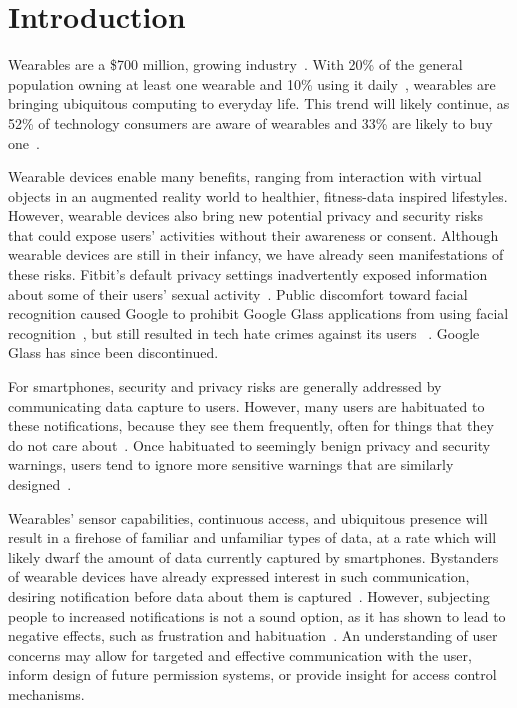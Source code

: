 
\section{Introduction}

Wearables are a \$700 million, growing industry~\cite{cmo}. With 20\% of the general population owning at least one wearable and 10\% using it daily~\cite{WearableStatNews}, wearables are bringing ubiquitous computing to everyday life. This trend will likely continue, as 52\% of technology consumers are aware of wearables and 33\% are likely to buy one~\cite{NPD}.  

Wearable devices enable many benefits, ranging from interaction with virtual objects in an augmented reality world to healthier, fitness-data inspired lifestyles. However, wearable devices also bring new potential privacy and security risks that could expose users' activities without their awareness or consent. Although wearable devices are still in their infancy, we have already seen manifestations of these risks. Fitbit's default privacy settings inadvertently exposed information about some of their users' sexual activity~\cite{Fitbit}. Public discomfort toward facial recognition caused Google to prohibit Google Glass applications from using facial recognition~\cite{GlassDetection}, but still resulted in tech hate crimes against its users ~\cite{1_russell_2014, 16_gross_2014}. Google Glass has since been discontinued.

For smartphones, security and privacy risks are generally addressed by communicating data capture to users. However, many users are habituated to these notifications, because they see them frequently, often for things that they do not care about~\cite{felt2012android}. Once habituated to seemingly benign privacy and security warnings, users tend to ignore more sensitive warnings that are similarly designed~\cite{Egelman08}. 

Wearables' sensor capabilities, continuous access, and ubiquitous presence will result in a firehose of familiar and unfamiliar types of data, at a rate which will likely dwarf the amount of data currently captured by smartphones. Bystanders of wearable devices have already expressed interest in such communication, desiring notification before data about them is captured~\cite{denning2014situ}. However, subjecting people to increased notifications is not a sound option, as it has shown to lead to negative effects, such as frustration and habituation~\cite{bohme2011security}. An understanding of user concerns may allow for targeted and effective communication with the user, inform design of future permission systems, or provide insight for access control mechanisms. 

